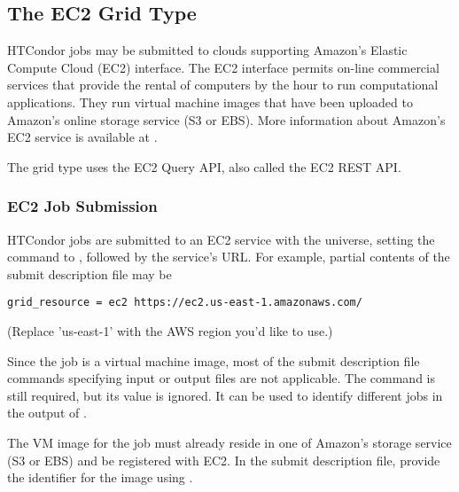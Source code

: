 \subsection{\label{sec:Amazon}The EC2 Grid Type }

HTCondor jobs may be submitted to clouds supporting
Amazon's Elastic Compute Cloud (EC2) interface.
The EC2 interface permits on-line commercial services that provide
the rental of computers by the hour to run computational applications.
They run virtual machine images that have been uploaded to Amazon's
online storage service (S3 or EBS).
More information about Amazon's EC2 service is available at
.

The  grid type uses the EC2 Query API,
also called the EC2 REST API.

\subsubsection{\label{sec:Amazon-submit}EC2 Job Submission}

HTCondor jobs are submitted to an EC2 service
with the  universe, setting the
 command to , followed 
by the service's URL. For example,
partial contents of the submit description file may be
\begin{verbatim}
grid_resource = ec2 https://ec2.us-east-1.amazonaws.com/
\end{verbatim}
(Replace 'us-east-1' with the AWS region you'd like to use.)

Since the job is a virtual machine image,
most of the submit description file commands
specifying input or output files are not applicable.
The  command is still required,
but its value is ignored. 
It can be used to identify different jobs in the output of .

The VM image for the job must already reside in one of Amazon's storage
service (S3 or EBS) and be registered with EC2.
In the submit description file,
provide the identifier for the image using .

